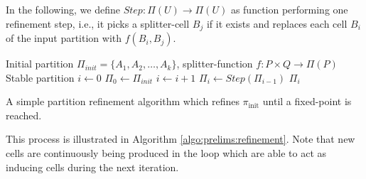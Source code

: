 		In the following, we define $Step: \Pi(U) \rightarrow \Pi(U)$ as function performing one refinement step, i.e., it picks a splitter-cell $B_j$ if it exists and replaces each cell $B_i$ of the input partition with $f(B_i, B_j)$.

		\begin{algorithm}[ht!]
			\centering
			\begin{algorithmic}
				\Require Initial partition $\Pi_{init} = \{ A_1, A_2, \ldots, A_k \}$, splitter-function $f: P \times Q \rightarrow \Pi(P)$
				\Ensure Stable partition
				\Statex
					\State $i \gets 0$
					\State $\Pi_0 \gets \Pi_{init}$
					\Repeat
						\State $i \gets i + 1$
						\State $\Pi_i \gets Step(\Pi_{i-1})$
					\State \Return $\Pi_i$
				\EndFunction
			\end{algorithmic}
			\caption{A simple partition refinement algorithm which refines $\pi_{\mathrm{init}}$ until a fixed-point is reached.}
			\label{algo:prelims:refinement}
		\end{algorithm}
		
%		
%		
%		
%		

		
		This process is illustrated in Algorithm \ref{algo:prelims:refinement}. Note that new cells are continuously being produced in the loop which are able to act as inducing cells during the next iteration. 
		
